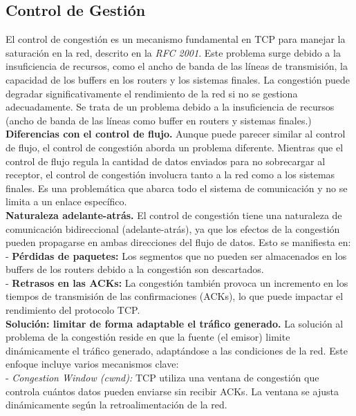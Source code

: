 \documentclass[a4paper,12pt]{article}
\begin{document}
\subsection{Control de Gestión}

El control de congestión es un mecanismo fundamental en TCP para manejar la saturación en la red, descrito en la \textit{RFC 2001}. Este problema surge debido a la insuficiencia de recursos, como el ancho de banda de las líneas de transmisión, la capacidad de los buffers en los routers y los sistemas finales. La congestión puede degradar significativamente el rendimiento de la red si no se gestiona adecuadamente. Se trata de un problema debido a la insuficiencia de recursos (ancho de banda de las líneas como buffer en routers y sistemas finales.)\\

\textbf{Diferencias con el control de flujo.}  
Aunque puede parecer similar al control de flujo, el control de congestión aborda un problema diferente. Mientras que el control de flujo regula la cantidad de datos enviados para no sobrecargar al receptor, el control de congestión involucra tanto a la red como a los sistemas finales. Es una problemática que abarca todo el sistema de comunicación y no se limita a un enlace específico.\\

\textbf{Naturaleza adelante-atrás.}  
El control de congestión tiene una naturaleza de comunicación bidireccional (adelante-atrás), ya que los efectos de la congestión pueden propagarse en ambas direcciones del flujo de datos. Esto se manifiesta en:\\

- \textbf{Pérdidas de paquetes:} Los segmentos que no pueden ser almacenados en los buffers de los routers debido a la congestión son descartados.\\
- \textbf{Retrasos en las ACKs:} La congestión también provoca un incremento en los tiempos de transmisión de las confirmaciones (ACKs), lo que puede impactar el rendimiento del protocolo TCP.\\

\textbf{Solución: limitar de forma adaptable el tráfico generado.}  
La solución al problema de la congestión reside en que la fuente (el emisor) limite dinámicamente el tráfico generado, adaptándose a las condiciones de la red. Este enfoque incluye varios mecanismos clave:\\

- \textit{Congestion Window (cwnd):} TCP utiliza una ventana de congestión que controla cuántos datos pueden enviarse sin recibir ACKs. La ventana se ajusta dinámicamente según la retroalimentación de la red.\\
\end{document}
